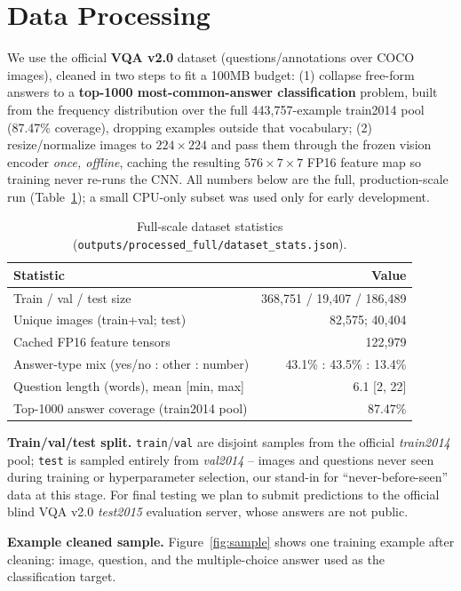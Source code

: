 \documentclass[final]{article}
\begin{document}
\section*{Data Processing}

We use the official \textbf{VQA v2.0} dataset (questions/annotations over COCO images), cleaned
in two steps to fit a 100MB budget: (1) collapse free-form answers to a \textbf{top-1000
most-common-answer classification} problem, built from the frequency distribution over the full
443{,}757-example train2014 pool (87.47\% coverage), dropping examples outside that vocabulary;
(2) resize/normalize images to $224\times224$ and pass them through the frozen vision encoder
\emph{once, offline}, caching the resulting $576\times7\times7$ FP16 feature map so training
never re-runs the CNN. All numbers below are the full, production-scale run
(Table~\ref{tab:stats}); a small CPU-only subset was used only for early development.

\begin{table}[!htbp]
\centering
\footnotesize
\begin{tabular}{lr}
\toprule
Statistic & Value \\
\midrule
Train / val / test size & 368{,}751 / 19{,}407 / 186{,}489 \\
Unique images (train+val; test) & 82{,}575; 40{,}404 \\
Cached FP16 feature tensors & 122{,}979 \\
Answer-type mix (yes/no : other : number) & 43.1\% : 43.5\% : 13.4\% \\
Question length (words), mean [min, max] & 6.1 [2, 22] \\
Top-1000 answer coverage (train2014 pool) & 87.47\% \\
\bottomrule
\end{tabular}
\caption{Full-scale dataset statistics (\texttt{outputs/processed\_full/dataset\_stats.json}).}
\label{tab:stats}
\end{table}

\textbf{Train/val/test split.} \texttt{train}/\texttt{val} are disjoint samples from the
official \emph{train2014} pool; \texttt{test} is sampled entirely from \emph{val2014} -- images
and questions never seen during training or hyperparameter selection, our stand-in for
``never-before-seen'' data at this stage. For final testing we plan to submit predictions to the
official blind VQA v2.0 \emph{test2015} evaluation server, whose answers are not public.

\textbf{Example cleaned sample.} Figure~\ref{fig:sample} shows one training example after
cleaning: image, question, and the multiple-choice answer used as the classification target.
\end{document}
